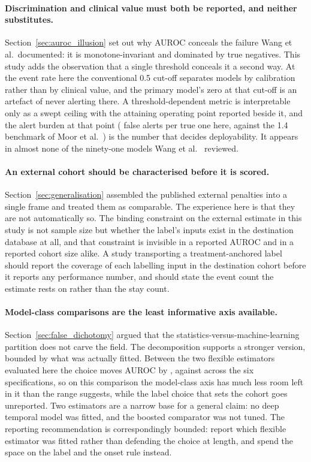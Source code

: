 \paragraph{Discrimination and clinical value must both be reported, and neither
substitutes.}
Section~\ref{sec:auroc_illusion} set out why AUROC conceals the failure Wang et
al.\ documented: it is monotone-invariant and dominated by true negatives.
This study adds the observation that a single threshold conceals it a second
way. At the event rate here the conventional 0.5 cut-off separates models by
calibration rather than by clinical value, and the primary model's zero at that
cut-off is an artefact of never alerting there. A threshold-dependent metric is
interpretable only as a swept ceiling with the attaining operating point
reported beside it, and the alert burden at that point (\pcUtilityOptBurdenGbtB{} false alerts per true one here, against the 1.4
benchmark of Moor et al.\ \cite{moor2023review}) is the number that decides
deployability. It appears in almost none of the ninety-one models Wang et al.\
\cite{wang2025srpm} reviewed.

\paragraph{An external cohort should be characterised before it is scored.}
Section~\ref{sec:generalisation} assembled the published external penalties
into a single frame and treated them as comparable. The experience here is that
they are not automatically so. The binding constraint on the external estimate
in this study is not sample size but whether the label's inputs exist in the
destination database at all, and that constraint is invisible in a reported
AUROC and in a reported cohort size alike. A study transporting a
treatment-anchored label should report the coverage of each labelling input in
the destination cohort before it reports any performance number, and should
state the event count the estimate rests on rather than the stay count.

\paragraph{Model-class comparisons are the least informative axis available.}
Section~\ref{sec:false_dichotomy} argued that the statistics-versus-machine-learning
partition does not carve the field. The decomposition supports a stronger
version, bounded by what was actually fitted. Between the two flexible
estimators evaluated here the choice moves AUROC by \pcHSixAbsEst{}, against
\pcSpreadModelClass{} across the six specifications, so on this comparison the
model-class axis has much less room left in it than the range suggests, while
the label choice that sets the cohort goes unreported. Two estimators are a
narrow base for a general claim: no deep temporal model was fitted, and the
boosted comparator was not tuned. The reporting recommendation is
correspondingly bounded: report which flexible estimator was fitted rather than
defending the choice at length, and spend the space on the label and the onset
rule instead.

